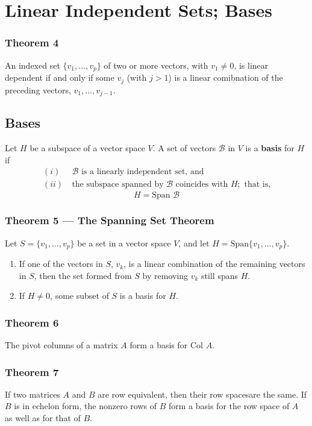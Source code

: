 \documentclass{article}
\begin{document}
\section*{Linear Independent Sets; Bases}

\subsubsection*{Theorem 4}
An indexed set $\{v_1, \ldots, v_p\}$ of two or more vectors, with $v_1 \neq 0$, is linear
dependent if and only if some $v_j$ (with $j > 1$) is a linear comibnation of the preceding
vectors, $v_1, \ldots, v_{j-1}$.

\subsection*{Bases}
Let $H$ be a subspace of a vector space $V$. A set of vectors $\mathcal{B}$ in $V$ is a
\textbf{basis} for $H$ if
\begin{align*}
    (i) & \ \mathcal{B} \text{ is a linearly independent set, and} \\
    (ii) & \ \text{the subspace spanned by } \mathcal{B} \text{ coincides with } H;
    \text{ that is,}
\end{align*}
\[H = \text{Span } \mathcal{B}\]

\subsubsection*{Theorem 5 --- The Spanning Set Theorem}
Let $S=\{v_1, \ldots, v_p\}$ be a set in a vector space $V$, and let
$H=\text{Span}\{v_1, \ldots, v_p\}$.
\begin{enumerate}
    \item If one of the vectors in $S$, $v_k$, is a linear combination of the remaining vectors in
    $S$, then the set formed from $S$ by removing $v_k$ still spans $H$.
    \item If $H\neq {0}$, some subset of $S$ is a basis for $H$.
\end{enumerate}

\subsubsection*{Theorem 6}
The pivot columns of a matrix $A$ form a basis for $\text{Col } A$.

\subsubsection*{Theorem 7}
If two matrices $A$ and $B$ are row equivalent, then their row spacesare the same. If $B$ is in
echelon form, the nonzero rows of $B$ form a basis for the row space of $A$ as well as for that of
$B$.
\end{document}
